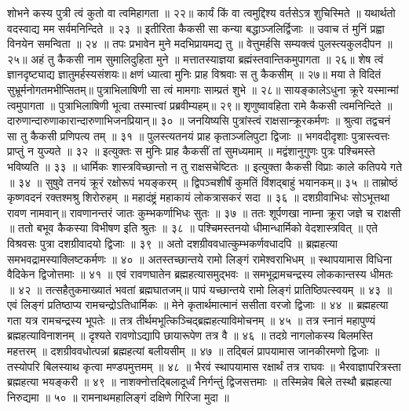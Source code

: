 शोभने कस्य पुत्री त्वं कुतो वा त्वमिहागता ॥ २२॥
कार्यं किं वा त्वमुद्दिश्य वर्तसेऽत्र शुचिस्मिते ॥
यथार्थतो वदस्वाद्य मम सर्वमनिन्दिते ॥ २३ ॥
इतीरिता कैकसी सा कन्या बद्धाञ्जलिर्द्विजाः ॥
उवाच तं मुनिं प्रह्वा विनयेन समन्विता ॥ २४ ॥
तपः प्रभावेन मुने मदभिप्रायमद्य तु ॥
वेत्तुमर्हसि सम्यक्त्वं पुलस्त्यकुलदीपन ॥ २५॥
अहं तु कैकसी नाम सुमालिदुहिता मुने ॥
मत्तातस्याज्ञया ब्रह्मंस्तवान्तिकमुपागता ॥ २६॥
शेष त्वं ज्ञानदृष्ट्याद्य ज्ञातुमर्हस्यसंशयः॥
क्षणं ध्यात्वा मुनिः प्राह विश्रवाः स तु कैकसीम् ॥ २७॥
मया ते विदितं सुभ्रूर्मनोगतमभीप्सितम्॥
पुत्राभिलाषिणी सा त्वं मामगाः साम्प्रतं शुभे ॥ २८॥
सायङ्कालेऽधुना क्रूरे यस्मान्मां त्वमुपागता ॥
पुत्राभिलाषिणी भूत्वा तस्मात्त्वां प्रब्रवीम्यहम्॥ २९॥
शृणुष्वावहिता रामे कैकसी त्वमनिन्दिते ॥
दारुणान्दारुणाकारान्दारुणाभिजनप्रियान्॥ ३० ॥
जनयिष्यसि पुत्रांस्त्वं राक्षसान्क्रूरकर्मणः ॥
श्रुत्वा तद्वचनं सा तु कैकसी प्रणिपत्य तम् ॥ ३१ ॥
पुलस्त्यतनयं प्राह कृताञ्जलिपुटा द्विजाः ॥
भगवदीदृशाः पुत्रास्त्वत्तः प्राप्तुं न युज्यते ॥ ३२ ॥
इत्युक्तः स मुनिः प्राह कैकसीं तां सुमध्यमाम् ॥
मद्वंशानुगुणः पुत्रः पश्चिमस्ते भविष्यति ॥ ३३ ॥
धार्मिकः शास्त्रविच्छान्तो न तु राक्षसचेष्टितः ॥
इत्युक्ता कैकसी विप्राः काले कतिपये गते ॥ ३४ ॥
सुषुवे तनयं क्रूरं रक्षोरूपं भयङ्करम् ॥
द्विपञ्चशीर्षं कुमतिं विंशद्बाहुं भयानकम्॥ ३५ ॥
ताम्रोष्ठं कृष्णवदनं रक्तश्मश्रु शिरोरुहम् ॥
महादंष्ट्रं महाकायं लोकत्रासकरं सदा ॥ ३६ ॥
दशग्रीवाभिधः सोऽभूत्तथा रावण नामवान्॥
रावणानन्तरं जातः कुम्भकर्णाभिधः सुतः ॥ ३७ ॥
ततः शूर्पणखा नाम्ना क्रूरा जज्ञे च राक्षसी ॥
ततो बभूव कैकस्या विभीषण इति श्रुतः ॥ ३८ ॥
पश्चिमस्तनयो धीमान्धार्मिको वेदशास्त्रवित् ॥
एते विश्रवसः पुत्रा दशग्रीवादयो द्विजाः ॥ ३९ ॥
अतो दशग्रीववधात्कुम्भकर्णवधादपि ॥
ब्रह्महत्या समभवद्रामस्याक्लिष्टकर्मणः ॥ ४० ॥
अतस्तच्छान्तये रामो लिङ्गं रामेश्वराभिधम् ॥
स्थापयामास विधिना वैदिकेन द्विजोत्तमाः ॥ ४१ ॥
एवं रावणघातेन ब्रह्महत्यासमुद्भवः ॥
समभूद्रामचन्द्रस्य लोककान्तस्य धीमतः ॥ ४२ ॥
तत्सहैतुकमाख्यातं भवतां ब्रह्मघातजम्॥
पापं यच्छान्तये रामो लिङ्गं प्रातिष्ठिपत्स्वयम् ॥ ४३ ॥
एवं लिङ्गं प्रतिष्ठाप्य रामचन्द्रोऽतिधार्मिकः ॥
मेने कृतार्थमात्मानं ससीता वरजो द्विजाः ॥ ४४ ॥
ब्रह्महत्या गता यत्र रामचन्द्रस्य भूपतेः ॥
तत्र तीर्थमभूत्किञ्चिद्ब्रह्महत्याविमोचनम् ॥ ४५ ॥
तत्र स्नानं महापुण्यं ब्रह्महत्याविनाशनम् ॥
दृश्यते रावणोऽद्यापि छायारूपेण तत्र वै ॥ ४६ ॥
तदग्रे नागलोकस्य बिलमस्ति महत्तरम् ॥
दशग्रीववधोत्पन्नां ब्रह्महत्यां बलीयसीम् ॥ ४७ ॥
तद्बिलं प्रापयामास जानकीरमणो द्विजाः ॥
तस्योपरि बिलस्याथ कृत्वा मण्डपमुत्तमम् ॥ ४८ ॥
भैरवं स्थापयामास रक्षार्थं तत्र राघवः ॥
भैरवाज्ञापरित्रस्ता ब्रह्महत्या भयङ्करी ॥ ४९ ॥
नाशक्नोत्तद्बिलादूर्ध्वं निर्गन्तुं द्विजसत्तमाः ॥
तस्मिन्नेव बिले तस्थौ ब्रह्महत्या निरुद्यमा ॥ ५० ॥
रामनाथमहालिङ्गं दक्षिणे गिरिजा मुदा ॥
